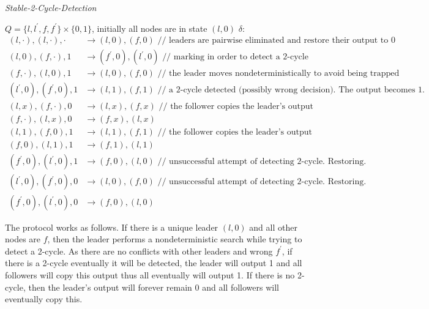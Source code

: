 \documentclass[preprint]{elsarticle}
\newcommand{\ra}{\rightarrow}
\begin{document}
\renewcommand{\algorithmiccomment}[1]{// #1}
\begin{algorithm}[!h]
  \caption{\emph{Stable-2-Cycle-Detection}}\label{prot:2cycle}
  \begin{algorithmic}
    \medskip
    \State $Q=\{l,l^\prime,f,f^\prime\}\times\{0,1\}$, initially all nodes are in state $(l,0)$
    \State $\delta$: 
    \begin{align*}
(l,\cdot), (l,\cdot), \cdot &\ra (l,0), (f,0)   \mbox{ // leaders are pairwise eliminated and
restore their output to 0}\\
(l,0), (f,\cdot), 1 &\ra (f^\prime,0), (l^\prime,0) \mbox{ // marking in order to detect a 2-cycle}\\
(f,\cdot), (l,0), 1 &\ra (l,0), (f,0) \mbox{ // the leader moves nondeterministically to avoid being trapped}\\
(l^\prime,0), (f^\prime,0), 1 &\ra (l,1), (f,1) \mbox{ // a 2-cycle detected (possibly wrong
decision). The output becomes 1.}\\
(l,x), (f,\cdot), 0 &\ra (l,x), (f,x) \mbox{ // the follower copies the leader's
output}\\
(f,\cdot), (l,x), 0 &\ra (f,x), (l,x)\\
(l,1), (f,0), 1 &\ra (l,1), (f,1) \mbox{ // the follower copies the leader's
output}\\
(f,0), (l,1), 1 &\ra (f,1), (l,1)\\
(f^\prime,0), (l^\prime,0), 1 &\ra (f,0), (l,0) \mbox{ // unsuccessful attempt of detecting
2-cycle. Restoring.}\\
(l^\prime,0), (f^\prime,0), 0 &\ra (l,0), (f,0) \mbox{ // unsuccessful attempt of detecting
2-cycle. Restoring.}\\
(f^\prime,0), (l^\prime,0), 0 &\ra (f,0), (l,0)
    \phantom{\hspace{10cm}}
    \end{align*}
  \end{algorithmic}
\end{algorithm}

The protocol works as follows. If there is a unique leader $(l,0)$ and all other nodes are $f$, then the leader performs a nondeterministic search while trying to detect a 2-cycle. As there are no
conflicts with other leaders and wrong $f^\prime$, if there is a 2-cycle
eventually it will be detected, the leader will output 1 and all followers
will copy this output thus all eventually will output 1. If there is no
2-cycle, then the leader's output will forever remain 0 and all followers
will eventually copy this.
\end{document}
